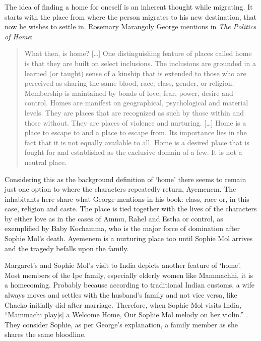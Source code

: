 The idea of finding a home for oneself is an inherent thought while migrating. It starts with the place from where the person migrates to his new destination, that now he wishes to settle in. Rosemary Marangoly George mentions in \emph{The Politics of Home}:

\begin{quote}
  What then, is home? [\ldots] One distinguishing feature of places called home is that they are built on select inclusions. The inclusions are grounded in a learned (or taught) sense of a kinship that is extended to those who are perceived as sharing the same blood, race, class, gender, or religion. Membership is maintained by bonds of love, fear, power, desire and control. Homes are manifest on geographical, psychological and material levels. They are places that are recognized as such by those within and those without. They are places of violence and nurturing. [\ldots] Home is a place to escape to and a place to escape from. Its importance lies in the fact that it is not equally available to all. Home is a desired place that is fought for and established as the exclusive domain of a few. It is not a neutral place. \parencite[9]{George1999} 
\end{quote}

Considering this as the background definition of `home' there seems to remain just one option to where the characters repeatedly return, Ayemenem. The inhabitants here share what George mentions in his book: class, race or, in this case, religion and caste. The place is tied together with the lives of the characters by either love as in the cases of Ammu, Rahel and Estha or control, as exemplified by Baby Kochamma, who is the major force of domination after Sophie Mol's death. Ayemenem is a nurturing place too until Sophie Mol arrives and the tragedy befalls upon the family. 

Margaret's and Sophie Mol's visit to India depicts another feature of `home'. Most members of the Ipe family, especially elderly women like Mammachhi, it is a homecoming. Probably because according to traditional Indian customs, a wife always moves and settles with the husband's family and not vice versa, like Chacko initially did after marriage. Therefore, when Sophie Mol visits India, ``Mammachi play[s] a Welcome Home, Our Sophie Mol melody on her violin.'' \parencite[183]{Roy1997}. They consider Sophie, as per George's explanation, a family member as she shares the same bloodline. 

